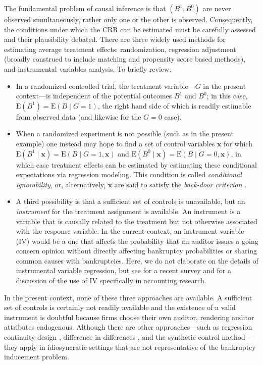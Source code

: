 \documentclass[aoas,preprint, 11pt, dvipsnames, table, x11name]{imsart}
\newcommand{\E}{\mbox{E}}
\theoremstyle{remark}
\begin{document}
	The fundamental problem of causal inference \citep{Holland-1986} is that $(B^1, B^0)$ are never observed simultaneously, rather only one or the other is observed. Consequently, the conditions under which the CRR can be estimated must be carefully assessed and their plausibility debated. There are three widely used methods for estimating average treatment effects: randomization, regression adjustment (broadly construed to include matching and propensity score based methods), and instrumental variables analysis. To briefly review:
	\begin{itemize}
		\item In a randomized controlled trial, the treatment variable---$G$ in the present context---is independent of the potential outcomes $B^1$ and $B^0$; in this case, $\E(B^1) = \E(B \mid G = 1)$, the right hand side of which is readily estimable from observed data (and likewise for the $G = 0$ case). 
		
	\item When a randomized experiment is not possible (such as in the present example) one instead may hope to find a set of control variables $\mathbf{x}$ for which $\E(B^1 \mid \mathbf{x}) = \E(B \mid G = 1, \mathbf{x})$ and $\E(B^0 \mid \mathbf{x}) = \E(B \mid G = 0, \mathbf{x})$, in which case treatment effects can be estimated by estimating these conditional expectations via regression modeling. This condition is called {\em conditional ignorability}, or, alternatively, $\mathbf{x}$ are said to satisfy the {\em back-door criterion} \cite{pearl-2000}. \color{black}
		
		\item A third possibility is that a sufficient set of controls is unavailable, but an {\em instrument} for the treatment assignment is available. An instrument is a variable that is causally related to the treatment but not otherwise associated with the response variable. In the current context, an instrument variable (IV) would be a one that affects the probability that an auditor issues a going concern opinion without directly affecting bankruptcy probabilities or sharing common causes with bankruptcies. 
		Here, we do not elaborate on the details of instrumental variable regression, but see \cite{imbens2014instrumental} for a recent survey and \cite{larcker2010use} for a discussion of the use of IV specifically in accounting research.
	\end{itemize}
	In the present context, none of these three approaches are available. A sufficient set of controls is certainly not readily available and the existence of a valid instrument is doubtful because firms choose their own auditor, rendering auditor attributes endogenous. Although there are other approaches---such as regression continuity design \citep{Imbens-rdd, Thistlethwaite-rdd}, difference-in-differences \citep{card1994}, and the synthetic control method \citep{abadie2010, abadie2003}---they apply in idiosyncratic settings that are not representative of the bankruptcy inducement problem. 
	
\end{document}
